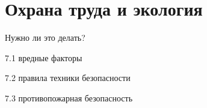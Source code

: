 \section{Охрана труда и экология}

Нужно ли это делать?

\begin{itemize*}
\item 7.1 вредные факторы
\item 7.2 правила техники безопасности
\item 7.3 противопожарная безопасность
\end{itemize*}
